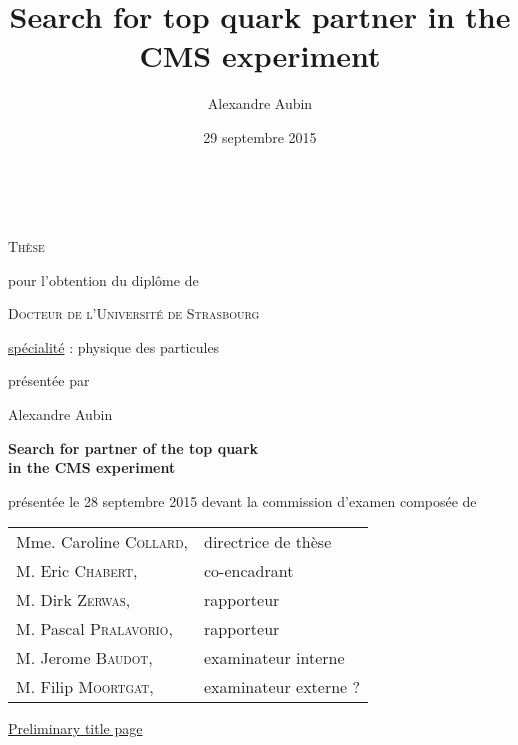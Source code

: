 


\title{Search for top quark partner in the CMS experiment}
\author{Alexandre Aubin}
\date{29 septembre 2015}



\begin{titlepage}
    \vspace*{1cm}
    \begin{center}
        \\

        \vspace*{0.8cm}

        {\Large \textsc{Thèse}}

        \vspace*{0.8cm}

        pour l'obtention du diplôme de

        \vspace*{0.8cm}

        {\Large \textsc{Docteur de l'Université de Strasbourg}}

        \vspace*{0.8cm}

        \underline{spécialité} : physique des particules

        \vspace*{0.8cm}

        présentée par

        Alexandre Aubin

        \vspace*{0.8cm}

        {\Large \textbf{Search for partner of the top quark\\ in the CMS experiment}}

        \vspace*{0.8cm}

        présentée le 28 septembre 2015 devant la commission d'examen composée de

        \vspace*{0.8cm}

        \begin{tabular}{ll}
            Mme. Caroline \textsc{Collard}, & directrice de thèse\\
            M. Eric \textsc{Chabert},       & co-encadrant\\
            M. Dirk \textsc{Zerwas},        & rapporteur\\
            M. Pascal \textsc{Pralavorio},  & rapporteur\\
            M. Jerome \textsc{Baudot},      & examinateur interne\\
            M. Filip \textsc{Moortgat},     & examinateur externe ?\\
        \end{tabular}

        \vspace*{0.5cm}

        \underline{\Huge{Preliminary title page}}

    \end{center}
    \vspace*{1cm}
\end{titlepage}


